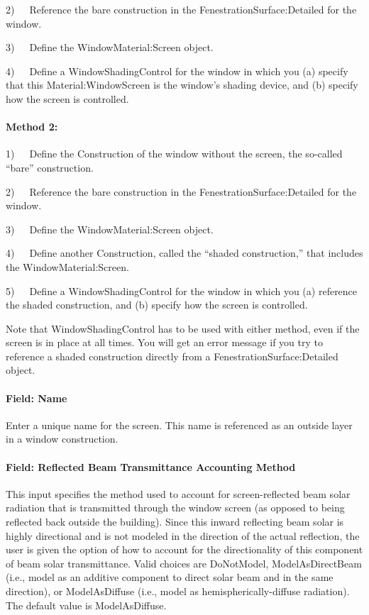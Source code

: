 2)~~~Reference the bare construction in the FenestrationSurface:Detailed for the window.

3)~~~Define the WindowMaterial:Screen object.

4)~~~Define a WindowShadingControl for the window in which you (a) specify that this Material:WindowScreen is the window's shading device, and (b) specify how the screen is controlled.

\paragraph{Method 2:}\label{method-2-2}

1)~~~Define the Construction of the window without the screen, the so-called ``bare'' construction.

2)~~~Reference the bare construction in the FenestrationSurface:Detailed for the window.

3)~~~Define the WindowMaterial:Screen object.

4)~~~Define another Construction, called the ``shaded construction,'' that includes the WindowMaterial:Screen.

5)~~~Define a WindowShadingControl for the window in which you (a) reference the shaded construction, and (b) specify how the screen is controlled.

Note that WindowShadingControl has to be used with either method, even if the screen is in place at all times. You will get an error message if you try to reference a shaded construction directly from a FenestrationSurface:Detailed object.

\paragraph{Field: Name}\label{field-name-19-004}

Enter a unique name for the screen. This name is referenced as an outside layer in a window construction.

\paragraph{Field: Reflected Beam Transmittance Accounting Method}\label{field-reflected-beam-transmittance-accounting-method}

This input specifies the method used to account for screen-reflected beam solar radiation that is transmitted through the window screen (as opposed to being reflected back outside the building). Since this inward reflecting beam solar is highly directional and is not modeled in the direction of the actual reflection, the user is given the option of how to account for the directionality of this component of beam solar transmittance. Valid choices are DoNotModel, ModelAsDirectBeam (i.e., model as an additive component to direct solar beam and in the same direction), or ModelAsDiffuse (i.e., model as hemispherically-diffuse radiation). The default value is ModelAsDiffuse.

